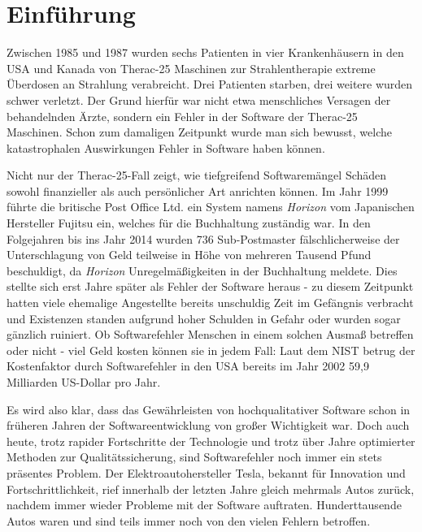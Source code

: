 \chapter{Einführung}\label{ch:einfuehrung}
Zwischen 1985 und 1987 wurden sechs Patienten in vier Krankenhäusern in den USA und Kanada von Therac-25 Maschinen zur Strahlentherapie extreme Überdosen an Strahlung verabreicht. Drei Patienten starben, drei weitere wurden schwer verletzt. Der Grund hierfür war nicht etwa menschliches Versagen der behandelnden Ärzte, sondern ein Fehler in der Software der Therac-25 Maschinen. \cite[S. 425]{baase:2008} Schon zum damaligen Zeitpunkt wurde man sich bewusst, welche katastrophalen Auswirkungen Fehler in Software haben können. 

Nicht nur der Therac-25-Fall zeigt, wie tiefgreifend Softwaremängel Schäden sowohl finanzieller als auch persönlicher Art anrichten können. Im Jahr 1999 führte die britische Post Office Ltd. ein System namens \textit{Horizon} vom Japanischen Hersteller Fujitsu ein, welches für die Buchhaltung zuständig war. In den Folgejahren bis ins Jahr 2014 wurden 736 Sub-Postmaster fälschlicherweise der Unterschlagung von Geld teilweise in Höhe von mehreren Tausend Pfund beschuldigt, da \textit{Horizon} Unregelmäßigkeiten in der Buchhaltung meldete. Dies stellte sich erst Jahre später als Fehler der Software heraus - zu diesem Zeitpunkt hatten viele ehemalige Angestellte bereits unschuldig Zeit im Gefängnis verbracht und Existenzen standen aufgrund hoher Schulden in Gefahr oder wurden sogar gänzlich ruiniert. \cite{bbc:2022} Ob Softwarefehler Menschen in einem solchen Ausmaß betreffen oder nicht - viel Geld kosten können sie in jedem Fall: Laut dem \ac{NIST} betrug der Kostenfaktor durch Softwarefehler in den USA bereits im Jahr 2002 59,9 Milliarden US-Dollar pro Jahr. \cite{nist:2002}

Es wird also klar, dass das Gewährleisten von hochqualitativer Software schon in früheren Jahren der Softwareentwicklung von großer Wichtigkeit war. Doch auch heute, trotz rapider Fortschritte der Technologie und trotz über Jahre optimierter Methoden zur Qualitätssicherung, sind Softwarefehler noch immer ein stets präsentes Problem. Der Elektroautohersteller Tesla, bekannt für Innovation und Fortschrittlichkeit, rief innerhalb der letzten Jahre gleich mehrmals Autos zurück, nachdem immer wieder Probleme mit der Software auftraten. Hunderttausende Autos waren und sind teils immer noch von den vielen Fehlern betroffen. \cite{kbb:2022}

